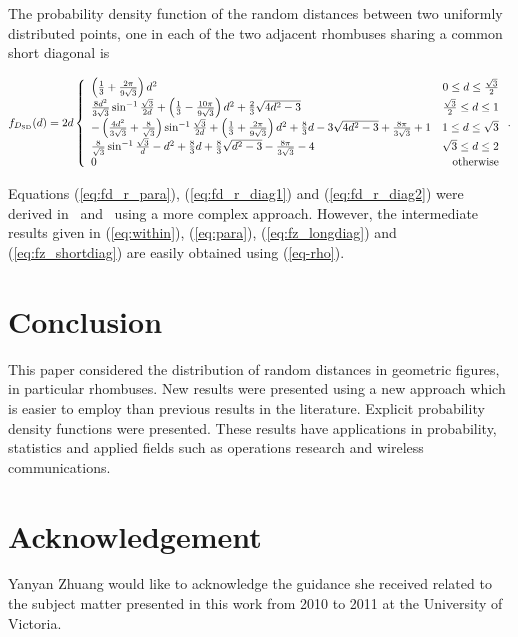 \documentclass[12pt,draftclsnofoot,onecolumn]{IEEEtran}
\begin{document}
The probability density function of the random distances between two uniformly
distributed points, one in each of the two adjacent rhombuses sharing a common
short diagonal is
\begin{small}
\begin{equation}\label{eq:fd_r_diag2}
  f_{D_{\rm SD}}(d)=2d\left\{
    \begin{array}{lr}

\left(\frac{1}{3}+\frac{2\pi}{9\sqrt{3}}\right)d^2 & 0\leq d\leq
\frac{\sqrt{3}}{2}\\

\frac{8d^2}{3\sqrt{3}}\sin^{-1}\frac{\sqrt{3}}{2d}+\left(\frac{1}{3}-\frac{10\pi
}{9\sqrt{3}}\right)d^2+\frac{2}{3}\sqrt{4d^2-3} & \frac{\sqrt{3}}{2} \leq d \leq
1\\

-\left(\frac{4d^2}{3\sqrt{3}}+\frac{8}{\sqrt{3}}\right)\sin^{-1}\frac{\sqrt{3}}{
2d}+\left(\frac{1}{3}+\frac{2\pi}{9\sqrt{3}}\right)d^2+\frac{8}{3}d-3\sqrt{
4d^2-3}+\frac{8\pi}{3\sqrt{3}}+1 & 1\leq d\leq \sqrt{3} \\

\frac{8}{\sqrt{3}}\sin^{-1}\frac{\sqrt{3}}{d}-d^2+\frac{8}{3}d+\frac{8}{3}\sqrt{
d^2-3}-\frac{8\pi}{3\sqrt{3}}-4 & \sqrt{3}\leq d\leq 2 \\

      0 & {\rm otherwise}
    \end{array}
  \right..
\end{equation}
\end{small}

Equations (\ref{eq:fd_r_para}), (\ref{eq:fd_r_diag1}) and
(\ref{eq:fd_r_diag2}) were derived in~\cite{zhuang2011random}
and~\cite{zhuang2012geometrical} using a more complex approach.
However, the intermediate results given in (\ref{eq:within}), (\ref{eq:para}),
(\ref{eq:fz_longdiag}) and (\ref{eq:fz_shortdiag}) are easily obtained using (\ref{eq-rho}).

\section{Conclusion}
This paper considered the distribution of random distances in geometric figures,
in particular rhombuses.
New results were presented using a new approach which is easier to
employ than previous results in the literature.
Explicit probability density functions were presented.
These results have applications in probability, statistics and applied fields
such as operations research and wireless communications.

\section*{Acknowledgement}
Yanyan Zhuang would like to acknowledge the guidance she received related to the
subject matter presented in this work from 2010 to 2011 at the University of
Victoria.



\end{document}
